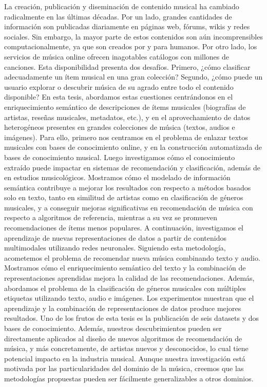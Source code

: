 La creación, publicación y diseminación de contenido musical ha cambiado radicalmente en las últimas décadas. Por un lado, grandes cantidades de información son publicadas diariamente en páginas web, fórums, wikis y redes sociales. Sin embargo, la mayor parte de estos contenidos son aún incomprensibles computacionalmente, ya que son creados por y para humanos. Por otro lado, los servicios de música online ofrecen inagotables catálogos con millones de canciones. Esta disponibilidad presenta dos desafíos. Primero, ¿cómo clasificar adecuadamente un ítem musical en una gran colección? Segundo, ¿cómo puede un usuario explorar o descubrir música de su agrado entre todo el contenido disponible? En esta tesis, abordamos estas cuestiones centrándonos en el enriquecimiento semántico de descripciones de ítems musicales (biografías de artistas, reseñas musicales, metadatos, etc.), y en el aprovechamiento de datos heterogéneos presentes en grandes colecciones de música (textos, audios e imágenes). Para ello, primero nos centramos en el problema de enlazar textos musicales con bases de conocimiento online, y en la construcción automatizada de bases de conocimiento musical. Luego investigamos cómo el conocimiento extraído puede impactar en sistemas de recomendación y clasificación, además de en estudios musicológicos. Mostramos cómo el modelado de información semántica contribuye a mejorar los resultados con respecto a métodos basados solo en texto, tanto en similitud de artistas como en clasificación de géneros musicales, y a conseguir mejoras significativas en recomendación de música con respecto a algoritmos de referencia, mientras a su vez se promueven recomendaciones de ítems menos populares. A continuación, investigamos el aprendizaje de nuevas representaciones de datos a partir de contenidos multimodales utilizando redes neuronales. Siguiendo esta metodología, acometemos el problema de recomendar nueva música combinando texto y audio. Mostramos cómo el enriquecimiento semántico del texto y la combinación de representaciones aprendidas mejora la calidad de las recomendaciones. Además, abordamos el problema de la clasificación de géneros musicales con múltiples etiquetas utilizando texto, audio e imágenes. Los experimentos muestran que el aprendizaje y la combinación de representaciones de datos produce mejores resultados. Uno de los frutos de esta tesis es la publicación de seis datasets y dos bases de conocimiento. Además, nuestros descubrimientos pueden ser directamente aplicados al diseño de nuevos algoritmos de recomendación de música, y más concretamente, de artistas nuevos y desconocidos, lo cual tiene potencial impacto en la industria musical. Aunque nuestra investigación está motivada por las particularidades del dominio de la música, creemos que las metodologías propuestas pueden ser fácilmente generalizables a otros dominios.